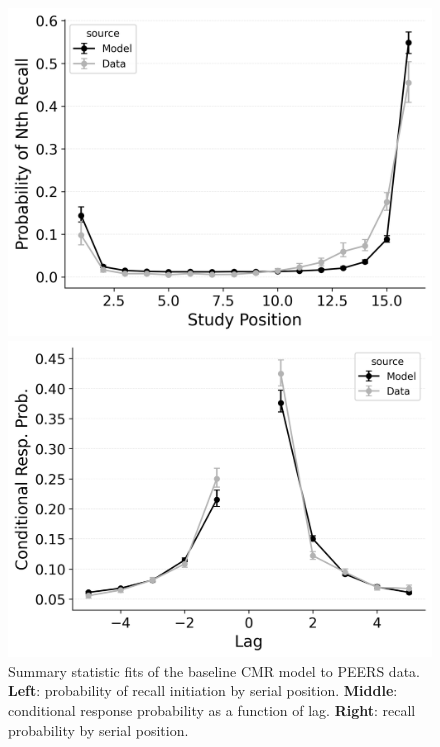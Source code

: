 \documentclass[
  man,
  floatsintext,
  longtable,
  nolmodern,
  notxfonts,
  notimes,
  draftfirst,
  colorlinks=true,linkcolor=blue,citecolor=blue,urlcolor=blue]{apa7}
\begin{document}
\begin{figure}

\caption{\label{fig-cmr}Summary statistic fits of the baseline CMR model
to PEERS data. \textbf{Left}: probability of recall initiation by serial
position. \textbf{Middle}: conditional response probability as a
function of lag. \textbf{Right}: recall probability by serial position.}

\begin{minipage}{0.33\linewidth}
\includegraphics{figures/bw_HealeyKahana2014_BaseCMR_Fitting_pnr.png}\end{minipage}%
%
\begin{minipage}{0.33\linewidth}
\includegraphics{figures/bw_HealeyKahana2014_BaseCMR_Fitting_crp.png}\end{minipage}%

\end{figure}
\end{document}
